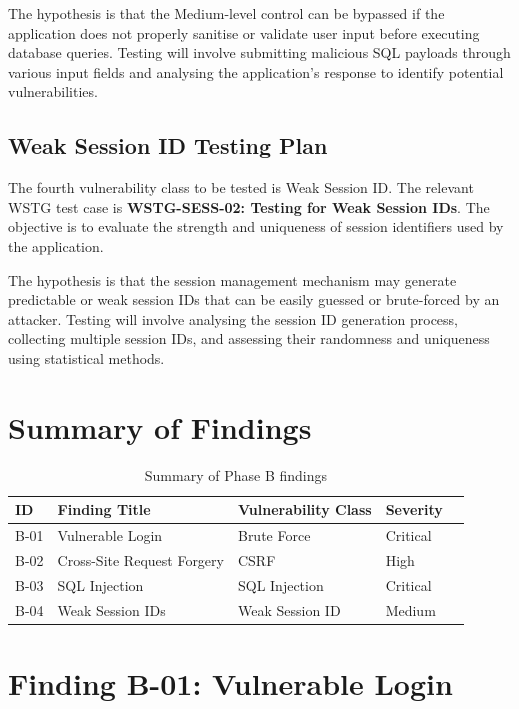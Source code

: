 \documentclass[11pt,a4paper]{report}
\begin{document}
    The hypothesis is that the Medium-level control can be bypassed if the application does not properly sanitise or validate user input before executing database queries. Testing will involve submitting malicious SQL payloads through various input fields and analysing the application's response to identify potential vulnerabilities.

    \subsection{Weak Session ID Testing Plan}

    The fourth vulnerability class to be tested is Weak Session ID. The relevant WSTG test case is \textbf{WSTG-SESS-02: Testing for Weak Session IDs}. The objective is to evaluate the strength and uniqueness of session identifiers used by the application.

    The hypothesis is that the session management mechanism may generate predictable or weak session IDs that can be easily guessed or brute-forced by an attacker. Testing will involve analysing the session ID generation process, collecting multiple session IDs, and assessing their randomness and uniqueness using statistical methods.

    \section{Summary of Findings}
    \label{sec:phase-b-summary}

    \begin{table}[H]
    \centering
    \renewcommand{\arraystretch}{1.35}
    \begin{tabular}{|p{1.2cm}|p{4cm}|p{3.2cm}|p{2.2cm}|p{3cm}|}
    \hline
    \textbf{ID} & \textbf{Finding Title} & \textbf{Vulnerability Class} & \textbf{Severity} \\
    \hline
    B-01 & Vulnerable Login & Brute Force & Critical \\
    \hline
    B-02 & Cross-Site Request Forgery & CSRF & High \\
    \hline
    B-03 & SQL Injection & SQL Injection & Critical \\
    \hline
    B-04 & Weak Session IDs & Weak Session ID & Medium \\
    \hline
    \end{tabular}
    \caption{Summary of Phase B findings}
    \label{tab:phase-b-summary}
    \end{table}

    \section{Finding B-01: Vulnerable Login}
    \label{sec:finding-b01}
\end{document}
